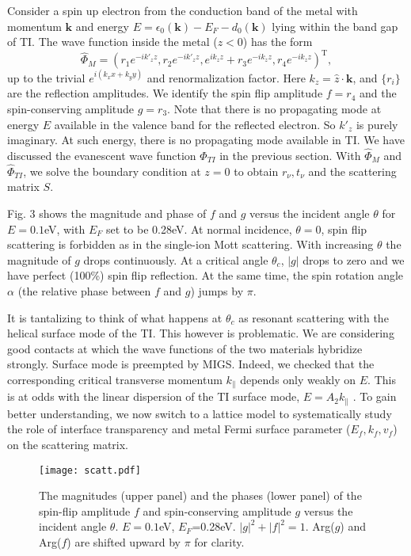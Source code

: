 \documentclass[11pt,revtex,aps]{report}
\def\v#1{\mathbf{#1}}
\begin{document}
Consider a spin up electron from the conduction band of the metal 
with momentum $\v{k}$ and energy $E=
\epsilon_0(\v{k})-E_F-d_0(\v{k})$ lying within the band gap of TI.
The wave function inside the metal ($z<0$) has the form
\[
\hat{\Phi}_M=(r_1e^{-ik'_{z} z},r_2e^{-ik'_{z}z},e^{ik_{z}z}+r_3 e^{-ik_{z}z} ,r_4 e^{-ik_{z}z})^{\mathrm{T}},
\]
up to the trivial $e^{i(k_x x+k_y y)}$ and renormalization factor.
Here $k_z=\hat{z}\cdot\v{k}$, and $\{r_i\}$ are the reflection amplitudes. We identify 
the spin flip amplitude $f=r_4$ and the spin-conserving amplitude $g=r_3$. Note that 
there is no propagating mode at energy $E$ available in the valence band 
for the reflected electron. So $k'_z$ is purely imaginary. 
%
At such energy, there is no propagating mode available in TI. We have discussed the 
evanescent wave function $\hat{\Phi}_{TI}$ in the previous section.
With $\hat{\Phi}_{M}$ and $\hat{\Phi}_{TI}$, we solve the boundary condition at $z=0$ 
to obtain $r_\nu, t_\nu$ and the scattering matrix $S$. 

Fig. 3 shows the magnitude and phase of $f$ and $g$ versus the incident angle $\theta$ for $E=0.1$eV, with $E_F$ set to be 0.28eV. At normal incidence, $\theta=0$, spin flip scattering
is forbidden as in the single-ion Mott scattering. With increasing $\theta$ the magnitude of $g$ drops continuously. At a critical angle $\theta_c$, $|g|$ drops to zero and we have perfect (100\%) spin flip reflection.
At the same time, the spin rotation angle $\alpha$ (the relative phase between $f$ and $g$)
jumps by $\pi$.

It is tantalizing to think of what happens at $\theta_c$ as resonant scattering
with the helical surface mode of the TI. This however is problematic.
We are considering good contacts at which the wave functions of the two materials hybridize strongly. 
Surface mode is preempted by MIGS. Indeed, we checked that the corresponding critical 
transverse momentum $k_\parallel$ depends only weakly on $E$. This is at odds with
the linear dispersion of the TI surface mode, $E=A_2k_\parallel$ \cite{zhang2009}. To gain better
understanding, we now switch to a lattice model to systematically study the role of interface 
transparency and metal Fermi surface parameter ($E_f, k_f, v_f$) on the scattering matrix. 



\begin{figure}
\center
\texttt{[image: scatt.pdf]}
\caption{ The magnitudes (upper panel) and the phases (lower panel) of the spin-flip 
amplitude $f$ and spin-conserving amplitude $g$ versus the incident angle $\theta$.
$E=0.1$eV, $E_F$=0.28eV. $|g|^2+|f|^2=1$. Arg($g$) and Arg($f$) 
are shifted upward by $\pi$ for clarity.}
\end{figure}
\end{document}
